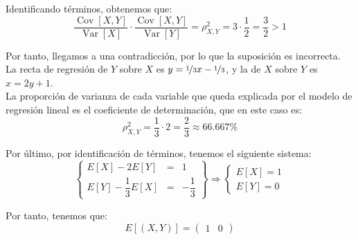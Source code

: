 \documentclass[12pt]{article}
\DeclareMathOperator{\Var}{Var}
\DeclareMathOperator{\Cov}{Cov}
\begin{document}
\begin{ejercicio}[3 puntos]
\begin{enumerate}
            Identificando términos, obtenemos que:
            \begin{equation*}
                \dfrac{\Cov[X,Y]}{\Var[X]}\cdot \dfrac{\Cov[X,Y]}{\Var[Y]} = \rho_{X,Y}^2 = 3\cdot \dfrac{1}{2} = \dfrac{3}{2}>1
            \end{equation*}

            Por tanto, llegamos a una contradicción, por lo que la suposición es incorrecta. La recta de regresión de $Y$ sobre $X$ es $y=\nicefrac{1}{3}x-\nicefrac{1}{3}$, y la de $X$ sobre $Y$ es $x=2y+1$.\\

            La proporción de varianza de cada variable que queda explicada por el modelo de regresión lineal es el coeficiente de determinación, que en este caso es:
            \begin{equation*}
                \rho_{X,Y}^2 = \dfrac{1}{3}\cdot 2=\dfrac{2}{3}\approx 66.667\%
            \end{equation*}

            Por último, por identificación de términos, tenemos el siguiente sistema:
            \begin{equation*}
                \left\{\begin{array}{rcl}
                    E[X]-2E[Y]&=&1 \\
                    E[Y]-\dfrac{1}{3}E[X]&=&-\dfrac{1}{3}
                \end{array}\right\}
                \Longrightarrow
                \begin{cases}
                    E[X]=1 \\
                    E[Y]=0
                \end{cases}
            \end{equation*}

            Por tanto, tenemos que:
            \begin{equation*}
                E[(X,Y)] = \begin{pmatrix}
                    1 & 0
                \end{pmatrix}
            \end{equation*}
        \end{enumerate}
    \end{ejercicio}
\end{document}
